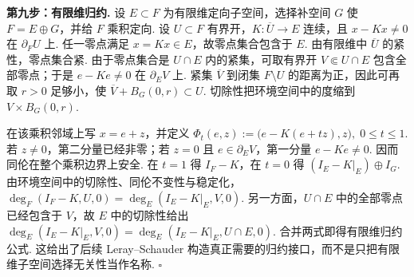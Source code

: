 \begin{FAProof}
\textbf{第九步：有限维归约.} 设 \(\displaystyle E\subset F\) 为有限维定向子空间，选择补空间 \(\displaystyle G\) 使 \(\displaystyle F=E\oplus G\)，并给 \(\displaystyle F\) 乘积定向. 设 \(\displaystyle U\subset F\) 有界开，\(\displaystyle K:\overline U\to E\) 连续，且 \(\displaystyle x-Kx\neq0\) 在 \(\displaystyle\partial_FU\) 上. 任一零点满足 \(\displaystyle x=Kx\in E\)，故零点集合包含于 \(\displaystyle E\). 由有限维中 \(\displaystyle\overline U\) 的紧性，零点集合紧. 由于零点集合是 \(\displaystyle U\cap E\) 内的紧集，可取有界开 \(\displaystyle V\Subset U\cap E\) 包含全部零点；于是 \(\displaystyle e-Ke\neq0\) 在 \(\displaystyle\partial_EV\) 上. 紧集 \(\displaystyle\overline V\) 到闭集 \(\displaystyle F\setminus U\) 的距离为正，因此可再取 \(\displaystyle r>0\) 足够小，使 \(\displaystyle\overline V+B_G(0,r)\subset U\). 切除性把环境空间中的度缩到 \(\displaystyle V\times B_G(0,r)\).

在该乘积邻域上写 \(\displaystyle x=e+z\)，并定义
\(\displaystyle \Phi_t(e,z) := \bigl(e-K(e+tz),z\bigr), \; 0\leqslant t\leqslant1.\)
若 \(\displaystyle z\neq0\)，第二分量已经非零；若 \(\displaystyle z=0\) 且 \(\displaystyle e\in\partial_EV\)，第一分量 \(\displaystyle e-Ke\neq0\). 因而同伦在整个乘积边界上安全. 在 \(\displaystyle t=1\) 得 \(\displaystyle I_F-K\)，在 \(\displaystyle t=0\) 得 \(\displaystyle(I_E-K|_E)\oplus I_G\). 由环境空间中的切除性、同伦不变性与稳定化，
\(\displaystyle \deg_F(I_F-K,U,0) = \deg_E(I_E-K|_E,V,0).\)
另一方面，\(\displaystyle U\cap E\) 中的全部零点已经包含于 \(\displaystyle V\)，故 \(\displaystyle E\) 中的切除性给出
\(\displaystyle \deg_E(I_E-K|_E,V,0) = \deg_E(I_E-K|_E,U\cap E,0).\)
合并两式即得有限维归约公式.
这给出了后续 Leray--Schauder 构造真正需要的归约接口，而不是只把有限维子空间选择无关性当作名称. \hfill\(\square\)
\end{FAProof}

